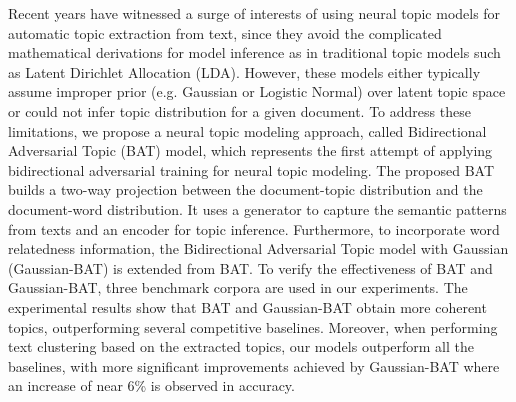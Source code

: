 Recent years have witnessed a surge of interests of using neural topic models for automatic topic extraction from text, since they avoid the complicated mathematical derivations for model inference as in traditional topic models such as Latent Dirichlet Allocation (LDA). However, these models either typically assume improper prior (e.g. Gaussian or Logistic Normal) over latent topic space or could not infer topic distribution for a given document. To address these limitations, we propose a neural topic modeling approach, called Bidirectional Adversarial Topic (BAT) model, which represents the first attempt of applying bidirectional adversarial training for neural topic modeling. The proposed BAT builds a two-way projection between the document-topic distribution and the document-word distribution. It uses a generator to capture the semantic patterns from texts and an encoder for topic inference. Furthermore, to incorporate word relatedness information, the Bidirectional Adversarial Topic model with Gaussian (Gaussian-BAT) is extended from BAT. To verify the effectiveness of BAT and Gaussian-BAT, three benchmark corpora are used in our experiments. The experimental results show that BAT and Gaussian-BAT obtain more coherent topics, outperforming several competitive baselines. Moreover, when performing text clustering based on the extracted topics, our models outperform all the baselines, with more significant improvements achieved by Gaussian-BAT where an increase of near 6\% is observed in accuracy.
